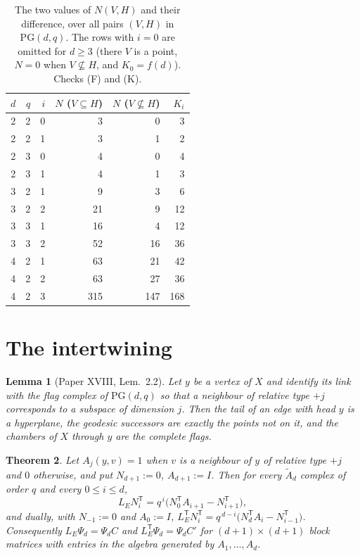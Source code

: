 \documentclass[11pt]{amsart}
\theoremstyle{plain}
\newtheorem{theorem}{Theorem}
\newtheorem{lemma}[theorem]{Lemma}
\theoremstyle{definition}
\theoremstyle{remark}
\newcommand{\LE}{L_E}
\newcommand{\PG}{\mathrm{PG}}
\newcommand{\Atilde}[1]{\widetilde A_{#1}}
\newcommand{\tp}{\mathsf{T}}
\begin{document}
\begin{table}[t]
\centering
\begin{tabular}{rrrrrr}
\toprule
$d$ & $q$ & $i$ & $N$ ($V\subseteq H$) & $N$ ($V\not\subseteq H$) & $K_i$\\
\midrule
2 & 2 & 0 &   3 &   0 &   3\\
2 & 2 & 1 &   3 &   1 &   2\\
2 & 3 & 0 &   4 &   0 &   4\\
2 & 3 & 1 &   4 &   1 &   3\\
3 & 2 & 1 &   9 &   3 &   6\\
3 & 2 & 2 &  21 &   9 &  12\\
3 & 3 & 1 &  16 &   4 &  12\\
3 & 3 & 2 &  52 &  16 &  36\\
4 & 2 & 1 &  63 &  21 &  42\\
4 & 2 & 2 &  63 &  27 &  36\\
4 & 2 & 3 & 315 & 147 & 168\\
\bottomrule
\end{tabular}
\caption{The two values of $N(V,H)$ and their difference, over all pairs $(V,H)$ in
$\PG(d,q)$. The rows with $i=0$ are omitted for $d\ge3$ (there $V$ is a point, $N=0$ when
$V\not\subseteq H$, and $K_0=f(d)$). Checks (F) and (K).}
\label{tab:flag}
\end{table}

\section{The intertwining}

\begin{lemma}[Paper XVIII, Lem.~2.2]\label{lem:link}
Let $y$ be a vertex of $X$ and identify its link with the flag complex of $\PG(d,q)$ so that
a neighbour of relative type $+j$ corresponds to a subspace of dimension $j$. Then the tail
of an edge with head $y$ is a hyperplane, the geodesic successors are exactly the points not
on it, and the chambers of $X$ through $y$ are the complete flags.
\end{lemma}

\begin{theorem}\label{thm:inter}
Let $A_j(y,v)=1$ when $v$ is a neighbour of $y$ of relative type $+j$ and $0$ otherwise, and
put $N_{d+1}:=0$, $A_{d+1}:=I$. Then for every $\Atilde d$ complex of order $q$ and every
$0\le i\le d$,
\begin{equation}\label{eq:rec}
  \LE N_i^{\tp}=q^{\,i}\bigl(N_0^{\tp}A_{i+1}-N_{i+1}^{\tp}\bigr),
\end{equation}
and dually, with $N_{-1}:=0$ and $A_0:=I$,
$\LE^{\tp}N_i^{\tp}=q^{\,d-i}\bigl(N_d^{\tp}A_{i}-N_{i-1}^{\tp}\bigr)$.
Consequently $\LE\Psi_d=\Psi_dC$ and $\LE^{\tp}\Psi_d=\Psi_dC'$ for $(d{+}1)\times(d{+}1)$
block matrices with entries in the algebra generated by $A_1,\dots,A_d$.
\end{theorem}
\end{document}
